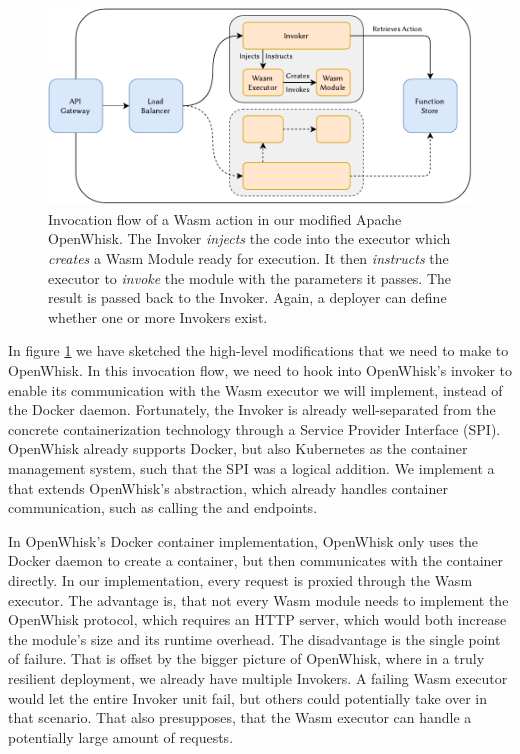 \begin{figure}
    \includegraphics{figures/WasmOpenWhiskActionInvocationFlow.pdf}
    \caption{Invocation flow of a Wasm action in our modified Apache OpenWhisk. The Invoker \emph{injects} the code into the executor which \emph{creates} a Wasm Module ready for execution. It then \emph{instructs} the executor to \emph{invoke} the module with the parameters it passes. The result is passed back to the Invoker. Again, a deployer can define whether one or more Invokers exist.}
    \label{fig:wasm-openwhisk-action-invocation-flow}
\end{figure}

In figure \ref{fig:wasm-openwhisk-action-invocation-flow} we have sketched the high-level modifications that we need to make to OpenWhisk. In this invocation flow, we need to hook into OpenWhisk's invoker to enable its communication with the Wasm executor we will implement, instead of the Docker daemon. Fortunately, the Invoker is already well-separated from the concrete containerization technology through a Service Provider Interface (SPI). OpenWhisk already supports Docker, but also Kubernetes as the container management system, such that the SPI was a logical addition. We implement a  that extends OpenWhisk's  abstraction, which already handles container communication, such as calling the  and  endpoints.


In OpenWhisk's Docker container implementation, OpenWhisk only uses the Docker daemon to create a container, but then communicates with the container directly. In our implementation, every request is proxied through the Wasm executor. The advantage is, that not every Wasm module needs to implement the OpenWhisk protocol, which requires an HTTP server, which would both increase the module's size and its runtime overhead. The disadvantage is the single point of failure. That is offset by the bigger picture of OpenWhisk, where in a truly resilient deployment, we already have multiple Invokers. A failing Wasm executor would let the entire Invoker unit fail, but others could potentially take over in that scenario. That also presupposes, that the Wasm executor can handle a potentially large amount of requests.

